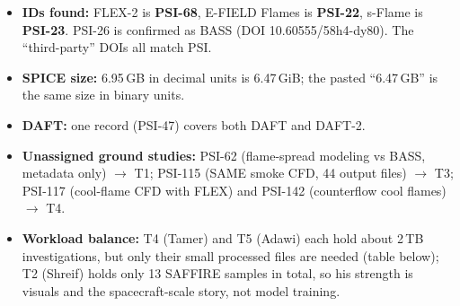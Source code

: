 \documentclass[10pt,a4paper]{article}
\begin{document}
\begin{itemize}
\item \textbf{IDs found:} FLEX-2 is \textbf{PSI-68}, E-FIELD Flames is \textbf{PSI-22}, s-Flame is \textbf{PSI-23}. PSI-26 is confirmed as BASS (DOI 10.60555/58h4-dy80). The ``third-party'' DOIs all match PSI.
\item \textbf{SPICE size:} 6.95\,GB in decimal units is 6.47\,GiB; the pasted ``6.47\,GB'' is the same size in binary units.
\item \textbf{DAFT:} one record (PSI-47) covers both DAFT and DAFT-2.
\item \textbf{Unassigned ground studies:} PSI-62 (flame-spread modeling vs BASS, metadata only) $\rightarrow$ T1; PSI-115 (SAME smoke CFD, 44 output files) $\rightarrow$ T3; PSI-117 (cool-flame CFD with FLEX) and PSI-142 (counterflow cool flames) $\rightarrow$ T4.
\item \textbf{Workload balance:} T4 (Tamer) and T5 (Adawi) each hold about 2\,TB investigations, but only their small processed files are needed (table below); T2 (Shreif) holds only 13 SAFFIRE samples in total, so his strength is visuals and the spacecraft-scale story, not model training.
\end{itemize}
\end{document}
